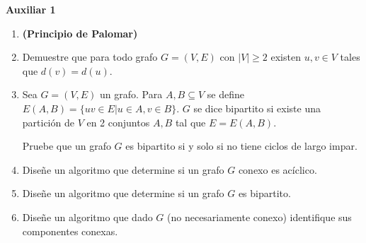 

\header
\begin{center}
	\LARGE \bf{Auxiliar 1}
\end{center}

\begin{enumerate}[label ={\bf P\arabic*}]
	\item \textbf{(Principio de Palomar)}
	
	\item Demuestre que para todo grafo $G = (V,E)$ con $|V|\geq 2$ existen $u,v\in V$ tales que $d(v)=d(u)$.
	
	\item Sea  $G = (V,E)$ un grafo. Para $A, B \subseteq V$ se define $E(A,B) = \{uv \in E | u\in A, v\in B\}$.
		$G$ se dice bipartito si existe una partición de $V$ en 2 conjuntos $A, B$ tal que $E = E(A,B)$.

		Pruebe que un grafo $G$ es bipartito si y solo si no tiene ciclos de largo impar.

	\item Diseñe un algoritmo que determine si un grafo $G$ conexo es acíclico.
	\item Diseñe un algoritmo que determine si un grafo $G$ es bipartito.
	\item Diseñe un algoritmo que dado $G$ (no necesariamente conexo) identifique sus componentes conexas.


\end{enumerate}
